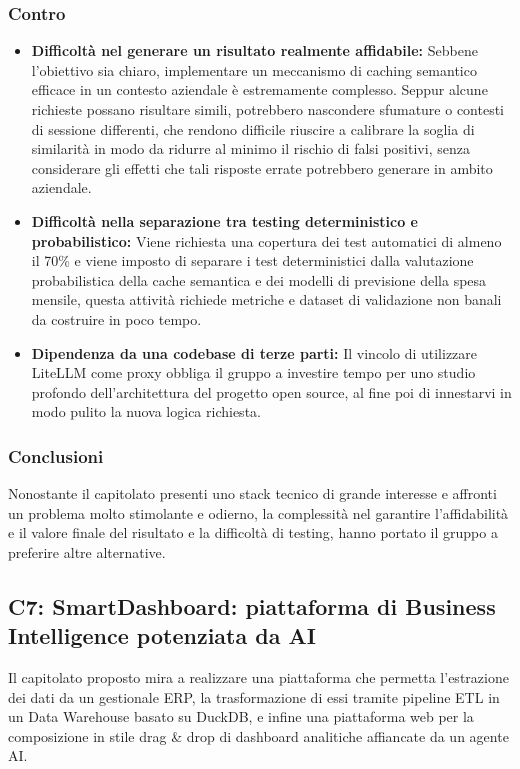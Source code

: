 \subsubsection{Contro}
\begin{itemize}
    \item \textbf{Difficoltà nel generare un risultato realmente affidabile:} Sebbene l'obiettivo sia chiaro, implementare un meccanismo di caching semantico efficace in un contesto aziendale è estremamente complesso. Seppur alcune richieste possano risultare simili, potrebbero nascondere sfumature o contesti di sessione differenti, che rendono difficile riuscire a calibrare la soglia di similarità in modo da ridurre al minimo il rischio di falsi positivi, senza considerare gli effetti che tali risposte errate potrebbero generare in ambito aziendale.
    \item \textbf{Difficoltà nella separazione tra testing deterministico e probabilistico:} Viene richiesta una copertura dei test automatici di almeno il 70\% e viene imposto di separare i test deterministici dalla valutazione probabilistica della cache semantica e dei modelli di previsione della spesa mensile, questa attività richiede metriche e dataset di validazione non banali da costruire in poco tempo.
    \item \textbf{Dipendenza da una codebase di terze parti:} Il vincolo di utilizzare LiteLLM come proxy obbliga il gruppo a investire tempo per uno studio profondo dell'architettura del progetto open source, al fine poi di innestarvi in modo pulito la nuova logica richiesta.
\end{itemize}

\subsubsection{Conclusioni}
Nonostante il capitolato presenti uno stack tecnico di grande interesse e affronti un problema molto stimolante e odierno, la complessità nel garantire l'affidabilità e il valore finale del risultato e la difficoltà di testing, hanno portato il gruppo a preferire altre alternative.

\subsection{C7: SmartDashboard: piattaforma di Business Intelligence potenziata da AI}

Il capitolato proposto mira a realizzare una piattaforma che permetta l'estrazione dei dati da un gestionale ERP, la trasformazione di essi tramite pipeline ETL in un Data Warehouse basato su DuckDB, e infine una piattaforma web per la composizione in stile drag \& drop di dashboard analitiche affiancate da un agente AI.

